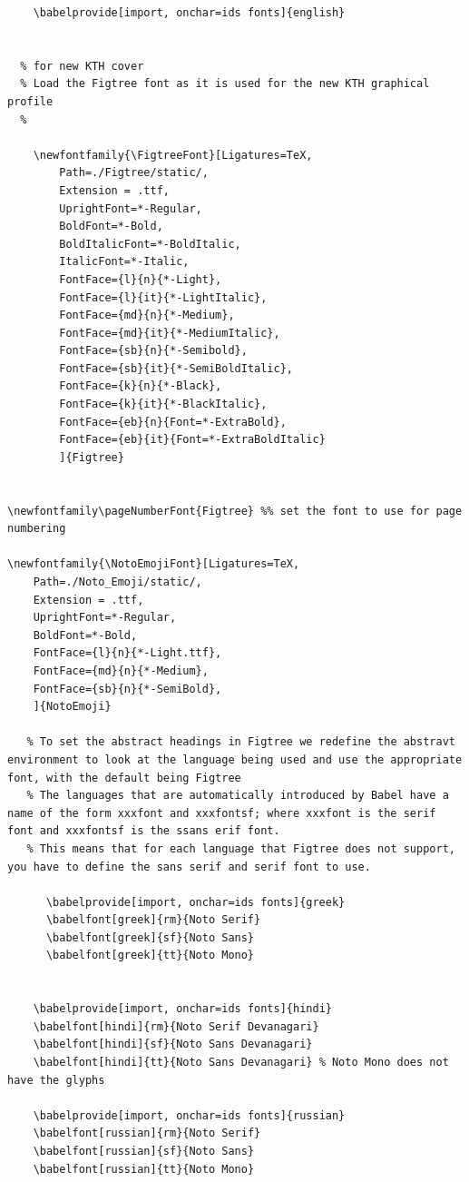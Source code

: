\documentclass[12pt, twoside]{article}
\begin{document}
\begin{lstlisting}[style=latexExampleForAuthors, caption={The main fonts used in the template in addition to Figtree}, label=lst:FontsUsed]
    % use english as a fallback when in other languages
    \babelprovide[import, onchar=ids fonts]{english}

    
  % for new KTH cover
  % Load the Figtree font as it is used for the new KTH graphical profile
  % 

    \newfontfamily{\FigtreeFont}[Ligatures=TeX,
        Path=./Figtree/static/,
        Extension = .ttf,
        UprightFont=*-Regular,
        BoldFont=*-Bold,
        BoldItalicFont=*-BoldItalic,
        ItalicFont=*-Italic,
        FontFace={l}{n}{*-Light},
        FontFace={l}{it}{*-LightItalic},
        FontFace={md}{n}{*-Medium},
        FontFace={md}{it}{*-MediumItalic},
        FontFace={sb}{n}{*-Semibold},
        FontFace={sb}{it}{*-SemiBoldItalic},
        FontFace={k}{n}{*-Black},
        FontFace={k}{it}{*-BlackItalic},
        FontFace={eb}{n}{Font=*-ExtraBold},
        FontFace={eb}{it}{Font=*-ExtraBoldItalic}
        ]{Figtree}


\newfontfamily\pageNumberFont{Figtree} %% set the font to use for page numbering

\newfontfamily{\NotoEmojiFont}[Ligatures=TeX,
    Path=./Noto_Emoji/static/,
    Extension = .ttf,
    UprightFont=*-Regular,
    BoldFont=*-Bold,
    FontFace={l}{n}{*-Light.ttf},
    FontFace={md}{n}{*-Medium},
    FontFace={sb}{n}{*-SemiBold},
    ]{NotoEmoji}

   % To set the abstract headings in Figtree we redefine the abstravt environment to look at the language being used and use the appropriate font, with the default being Figtree
   % The languages that are automatically introduced by Babel have a name of the form xxxfont and xxxfontsf; where xxxfont is the serif font and xxxfontsf is the ssans erif font.
   % This means that for each language that Figtree does not support, you have to define the sans serif and serif font to use.

      \babelprovide[import, onchar=ids fonts]{greek}
      \babelfont[greek]{rm}{Noto Serif}
      \babelfont[greek]{sf}{Noto Sans}
      \babelfont[greek]{tt}{Noto Mono}

  
    \babelprovide[import, onchar=ids fonts]{hindi}
    \babelfont[hindi]{rm}{Noto Serif Devanagari}
    \babelfont[hindi]{sf}{Noto Sans Devanagari}
    \babelfont[hindi]{tt}{Noto Sans Devanagari} % Noto Mono does not have the glyphs

    \babelprovide[import, onchar=ids fonts]{russian}
    \babelfont[russian]{rm}{Noto Serif}
    \babelfont[russian]{sf}{Noto Sans}
    \babelfont[russian]{tt}{Noto Mono}


\end{lstlisting}
\end{document}
